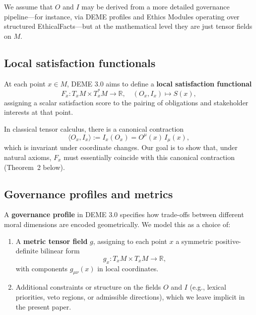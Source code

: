 \documentclass[12pt]{article}
\theoremstyle{remark}
\begin{document}
We assume that $O$ and $I$ may be derived from a more detailed governance pipeline---for instance, via DEME profiles and Ethics Modules operating over structured EthicalFacts---but at the mathematical level they are just tensor fields on $M$.

\subsection{Local satisfaction functionals}

At each point $x \in M$, DEME 3.0 aims to define a \textbf{local satisfaction functional}
\begin{equation}
    F_x\colon T_x M \times T_x^* M \to \mathbb{R},\quad (O_x, I_x) \mapsto S(x),
\end{equation}
assigning a scalar satisfaction score to the pairing of obligations and stakeholder interests at that point.

In classical tensor calculus, there is a canonical contraction
\begin{equation}
    \langle O_x, I_x \rangle := I_x(O_x) = O^\mu(x)\, I_\mu(x),
\end{equation}
which is invariant under coordinate changes. Our goal is to show that, under natural axioms, $F_x$ must essentially coincide with this canonical contraction (Theorem~2 below).

\subsection{Governance profiles and metrics}

A \textbf{governance profile} in DEME 3.0 specifies how trade-offs between different moral dimensions are encoded geometrically. We model this as a choice of:

\begin{enumerate}
    \item A \textbf{metric tensor field} $g$, assigning to each point $x$ a symmetric positive-definite bilinear form
    \begin{equation}
        g_x\colon T_x M \times T_x M \to \mathbb{R},
    \end{equation}
    with components $g_{\mu\nu}(x)$ in local coordinates.

    \item Additional constraints or structure on the fields $O$ and $I$ (e.g., lexical priorities, veto regions, or admissible directions), which we leave implicit in the present paper.
\end{enumerate}
\end{document}
